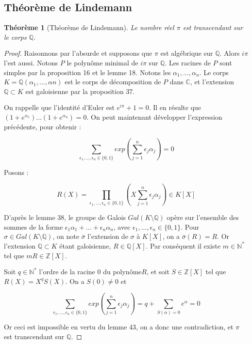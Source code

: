 \documentclass[12pt,a4paper]{report}
\newtheorem{thm}{\bf Th\'eor\`eme}
\begin{document}
\subsection{Théorème de Lindemann}

\begin{thm}[Théorème de Lindemann]\rm

Le nombre réel $\pi$ est transcendant sur le corps $\mathbb{Q}.$


\end{thm}

\begin{proof}
Raisonnons par l'absurde et supposons que $\pi$ est algébrique sur $\mathbb{Q}$. Alors $i\pi$ l'est aussi. Notons $P$ le polynôme minimal de $i\pi$ sur $\mathbb{Q}$. Les racines de $P$ sont simples par la proposition 16 et le lemme 18. Notons les $\alpha_{1},...,\alpha_{n}$. Le corps $K=\mathbb{Q}(\alpha_{1},..., \alpha{n})$ est le corps de décomposition de $P$ dans $\mathbb{C}$, et l'extension $\mathbb{Q}\subset K$ est galoisienne par la proposition 37. 

On rappelle que l'identité d'Euler est $e^{i \pi}+1=0$. Il en résulte que $(1+e^{\alpha_{1}})...(1+e^{\alpha_{n}})=0$. 
On peut maintenant développer l'expression précédente, pour obtenir :  

$$\sum_{\epsilon_{1},...,\epsilon_{n} \in \{0,1\}} exp\left(\sum_{j=1}^{n}\epsilon_{j}\alpha_{j}\right)=0$$

Posons : 

$$R(X)= \prod_{\epsilon_{1},...,\epsilon_{n} \in \{0,1\}}\left(X\sum_{j=1}^{n}\epsilon_{j}\alpha_{j}\right) \in K[X]$$

D'après le lemme 38, le groupe de Galois $Gal(K\setminus \mathbb{Q})$ opère sur l'ensemble des sommes de la forme $\epsilon_{1}\alpha_{1}+...+\epsilon_{n}\alpha_{n}$, avec $\epsilon_{1},...,\epsilon_{n} \in \{0,1\}$. Pour $\sigma \in Gal(K\setminus \mathbb{Q})$, on note $\bar{\sigma}$ l'extension de $ \sigma$ à $K[X]$, on a $\bar{\sigma}(R)=R.$ Or l'extension $\mathbb{Q}\subset K$ étant galoisienne, $R \in \mathbb{Q}[X].$ Par conséquent il existe $m \in \mathbb{N}^{*}$ tel que $mR \in \mathbb{Z}[X]$. 

Soit $q \in \mathbb{N}^{*}$ l'ordre de la racine 0 du polynôme$R$, et soit $S \in \mathbb{Z}[X]$ tel que $R(X)=X^{q}S(X)$. On a $S(0)\neq 0$ et 

$$ \sum_{\epsilon_{1},...,\epsilon_{n} \in \{0,1\}} exp\left(\sum_{j=1}^{n}\epsilon_{j}\alpha_{j}\right)= q+\sum_{S(\alpha)=0} e^{\alpha}=0$$

Or ceci est impossible en vertu du lemme 43, on a donc une contradiction, et $\pi$ est transcendant sur $\mathbb{Q}$. 

\end{proof}
\end{document}

